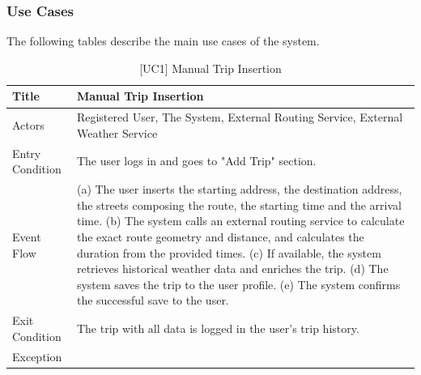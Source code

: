 \subsubsection{Use Cases}

The following tables describe the main use cases of the system.

\begin{table}[H]
    \centering
    \begin{tabular}{|p{4cm}|p{10cm}|}
        \hline
        Title & \textbf{Manual Trip Insertion} \\
        \hline
        Actors & Registered User, The System, External Routing Service, External Weather Service \\
        \hline
        Entry Condition & The user logs in and goes to "Add Trip" section. \\
        \hline
        Event Flow & 
        (a) The user inserts the starting address, the destination address, the streets composing the route, the starting time and the arrival time. \newline
        (b) The system calls an external routing service to calculate the exact route geometry and distance, and calculates the duration from the provided times. \newline
        (c) If available, the system retrieves historical weather data and enriches the trip. \newline
        (d) The system saves the trip to the user profile. \newline
        (e) The system confirms the successful save to the user. \\
        \hline
        Exit Condition & The trip with all data is logged in the user's trip history. \\
        \hline
        Exception & 
        \\
        \hline
    \end{tabular}
    \caption{[UC1] Manual Trip Insertion}
    \label{tab:uc1}
\end{table}

